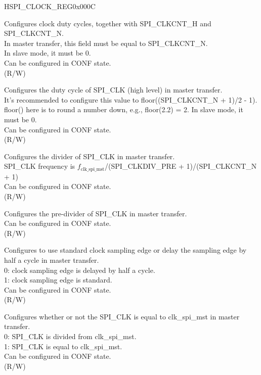 \begin{register}{H}{SPI\_CLOCK\_REG}{0x000C}\label{regdesc:SPICLOCKREG}
%
%
%
%
%
%
%
\regnewline%
\begin{regdesc}\begin{reglist}
\label{fielddesc:SPICLKCNTL}\item [SPI\_CLKCNT\_L]  Configures clock duty cycles, together with SPI\_CLKCNT\_H and SPI\_CLKCNT\_N.\\
In master transfer, this field must be equal to SPI\_CLKCNT\_N. \\
In slave mode, it must be 0. \\
Can be configured in CONF state.\\
(R/W)
\label{fielddesc:SPICLKCNTH}\item [SPI\_CLKCNT\_H] Configures the duty cycle of SPI\_CLK (high level) in master transfer. \\
It's recommended to configure this value to floor((SPI\_CLKCNT\_N + 1)/2 - 1). floor() here is to round a number down, e.g., floor(2.2) = 2. In slave mode, it must be 0. \\
Can be configured in CONF state. \\ (R/W)
\label{fielddesc:SPICLKCNTN}\item [SPI\_CLKCNT\_N] Configures the divider of SPI\_CLK in master transfer. \\
SPI\_CLK frequency is $f_{\textrm{clk\_spi\_mst}}$/(SPI\_CLKDIV\_PRE + 1)/(SPI\_CLKCNT\_N + 1) \\
Can be configured in CONF state. \\ (R/W)
\label{fielddesc:SPICLKDIVPRE}\item [SPI\_CLKDIV\_PRE] Configures the pre-divider of SPI\_CLK in master transfer. \\
Can be configured in CONF state. \\ (R/W)
\label{fielddesc:SPICLKEDGESEL}\item [SPI\_CLK\_EDGE\_SEL] Configures to use standard clock sampling edge or delay the sampling edge by half a cycle in master transfer.\\
0: clock sampling edge is delayed by half a cycle. \\
1: clock sampling edge is standard. \\
Can be configured in CONF state. \\
(R/W)
\label{fielddesc:SPICLKEQUSYSCLK}\item [SPI\_CLK\_EQU\_SYSCLK] Configures whether or not the SPI\_CLK is equal to clk\_spi\_mst in master transfer.\\
0: SPI\_CLK is divided from clk\_spi\_mst.\\
1: SPI\_CLK is equal to clk\_spi\_mst.\\
Can be configured in CONF state. \\ (R/W)
\end{reglist}\end{regdesc}
\end{register}


